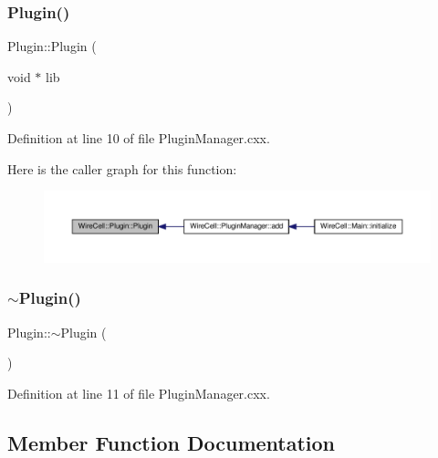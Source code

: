 \subsubsection{\texorpdfstring{Plugin()}{Plugin()}}
{\footnotesize\ttfamily Plugin\+::\+Plugin (\begin{DoxyParamCaption}\item[{void $\ast$}]{lib }\end{DoxyParamCaption})}



Definition at line 10 of file Plugin\+Manager.\+cxx.

Here is the caller graph for this function\+:
\nopagebreak
\begin{figure}[H]
\begin{center}
\leavevmode
\includegraphics[width=350pt]{class_wire_cell_1_1_plugin_ac49914ee387d36891a68c4f2308d8f6d_icgraph}
\end{center}
\end{figure}
\mbox{\label{class_wire_cell_1_1_plugin_aee4cc1864a2afa84a9ad935153f3fe39}} 
\subsubsection{\texorpdfstring{$\sim$\+Plugin()}{~Plugin()}}
{\footnotesize\ttfamily Plugin\+::$\sim$\+Plugin (\begin{DoxyParamCaption}{ }\end{DoxyParamCaption})}



Definition at line 11 of file Plugin\+Manager.\+cxx.



\subsection{Member Function Documentation}
\mbox{\label{class_wire_cell_1_1_plugin_ab8f49d4beba0924fa53ba45ec54ad649}} 

